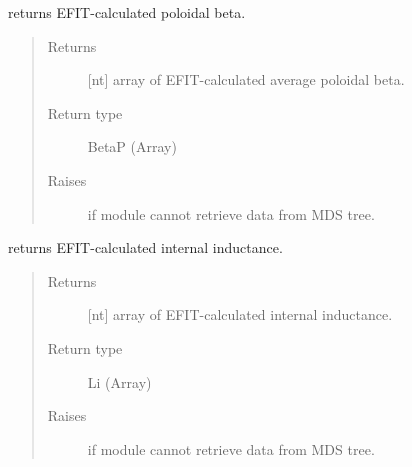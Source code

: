 \documentclass[letterpaper,10pt,english]{sphinxmanual}
\begin{document}
\begin{fulllineitems}

\begin{fulllineitems}
\label{\detokenize{eqtools:eqtools.EFIT.EFITTree.getBetaP}}
returns EFIT-calculated poloidal beta.
\begin{quote}\begin{description}
\item[{Returns}] \leavevmode
{[}nt{]} array of EFIT-calculated average poloidal beta.

\item[{Return type}] \leavevmode
BetaP (Array)

\item[{Raises}] \leavevmode
{} \textendash{} if module cannot retrieve data from MDS tree.

\end{description}\end{quote}

\end{fulllineitems}


\begin{fulllineitems}
\label{\detokenize{eqtools:eqtools.EFIT.EFITTree.getLi}}
returns EFIT-calculated internal inductance.
\begin{quote}\begin{description}
\item[{Returns}] \leavevmode
{[}nt{]} array of EFIT-calculated internal inductance.

\item[{Return type}] \leavevmode
Li (Array)

\item[{Raises}] \leavevmode
{} \textendash{} if module cannot retrieve data from MDS tree.

\end{description}\end{quote}

\end{fulllineitems}



\end{fulllineitems}
\end{document}
